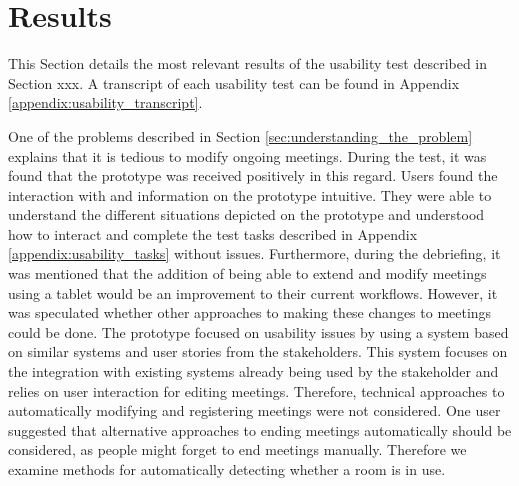 \section{Results}\label{sec:usability_evaluation_results}
This Section details the most relevant results of the usability test described in Section xxx.
A transcript of each usability test can be found in Appendix \ref{appendix:usability_transcript}.

One of the problems described in Section \ref{sec:understanding_the_problem} explains that it is tedious to modify ongoing meetings. 
During the test, it was found that the prototype was received positively in this regard. 
Users found the interaction with and information on the prototype intuitive. 
They were able to understand the different situations depicted on the prototype and understood how to interact and complete the test tasks described in Appendix \ref{appendix:usability_tasks} without issues. 
Furthermore, during the debriefing, it was mentioned that the addition of being able to extend and modify meetings using a tablet would be an improvement to their current workflows.
However, it was speculated whether other approaches to making these changes to meetings could be done. 
The prototype focused on usability issues by using a system based on similar systems and user stories from the stakeholders. 
This system focuses on the integration with existing systems already being used by the stakeholder and relies on user interaction for editing meetings. 
Therefore, technical approaches to automatically modifying and registering meetings were not considered. 
One user suggested that alternative approaches to ending meetings automatically should be considered, as people might forget to end meetings manually.
Therefore we examine methods for automatically detecting whether a room is in use.
